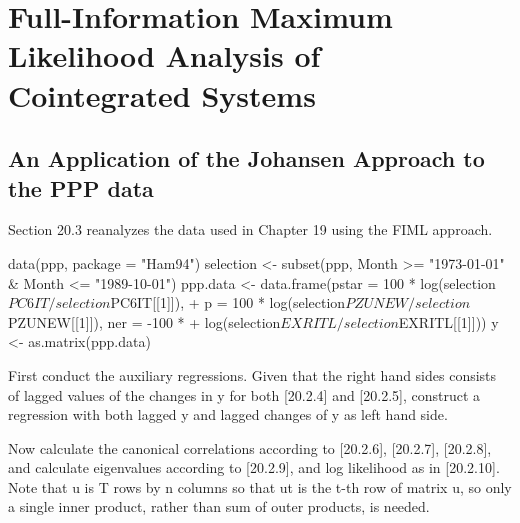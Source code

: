 \documentclass[a4paper]{article}
\begin{document}
\section{Full-Information Maximum Likelihood Analysis of Cointegrated Systems}
\subsection{An Application of the Johansen Approach to the PPP data}
Section 20.3 reanalyzes the data used in Chapter 19 using the FIML approach. 
\begin{Schunk}
\begin{Sinput}
 data(ppp, package = "Ham94")
 selection <- subset(ppp, Month >= "1973-01-01" & Month <= "1989-10-01")
 ppp.data <- data.frame(pstar = 100 * log(selection$PC6IT/selection$PC6IT[[1]]), 
+     p = 100 * log(selection$PZUNEW/selection$PZUNEW[[1]]), ner = -100 * 
+         log(selection$EXRITL/selection$EXRITL[[1]]))
 y <- as.matrix(ppp.data)
\end{Sinput}
\end{Schunk}
First conduct the auxiliary regressions.  Given that the right hand sides consists of lagged values of the changes in y
for both [20.2.4] and [20.2.5], construct a regression with both lagged y and lagged changes of y as left hand side.
\begin{Schunk}
\end{Schunk}
Now calculate the canonical correlations according to [20.2.6], [20.2.7], [20.2.8],
and calculate eigenvalues according to [20.2.9], and log likelihood as in [20.2.10].
Note that u is T rows by n columns
so that ut is the t-th row of matrix u, so only a single inner product, rather than sum of outer products, is needed.
\end{document}
